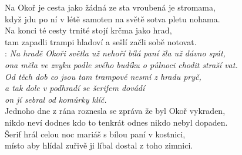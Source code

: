 
Na Okoř je cesta jako žádná ze sta vroubená je stromama,\\
když jdu po ní v létě samoten na světě sotva pletu nohama.\\
Na konci té cesty trnité stojí krčma jako hrad,\\
tam zapadli trampi hladoví a sešlí začli sobě notovat.\\

\textregistered: \emph{Na hradě Okoři světla už nehoří bílá paní šla už dávno spát,\\
ona měla ve zvyku podle svého budíku o půlnoci chodit straší vat.\\
Od těch dob co jsou tam trampové nesmí z hradu pryč,\\
a tak dole v podhradí se šerifem dovádí\\
on jí sebral od komůrky klíč.}\\

Jednoho dne z rána roznesla se zpráva že byl Okoř vykraden,\\
nikdo neví dodnes kdo to tenkrát odnes nikdo nebyl dopaden.\\
Šerif hrál celou noc mariáš s bílou paní v kostnici,\\
místo aby hlídal zuřivě ji líbal dostal z toho zimnici.\\

\textregistered

\newpage
